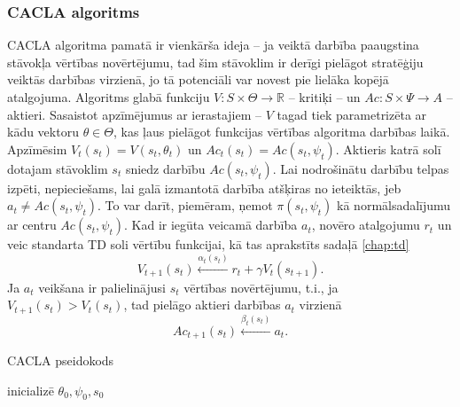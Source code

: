 \documentclass{ludis} %
\begin{document}
\subsubsection{CACLA algoritms}
CACLA algoritma pamatā ir vienkārša ideja -- ja veiktā darbība paaugstina stāvokļa vērtības novērtējumu, tad šim stāvoklim ir derīgi pielāgot stratēģiju veiktās darbības virzienā, jo tā potenciāli var novest pie lielāka kopējā atalgojuma.
Algoritms glabā funkciju $V:S \times \Theta \rightarrow \mathbb{R}$ -- kritiķi -- un $Ac : S \times \Psi \rightarrow A$ -- aktieri. Sasaistot apzīmējumus ar ierastajiem -- $V$ tagad tiek parametrizēta ar kādu vektoru $\theta \in \Theta$, kas ļaus pielāgot funkcijas vērtības algoritma darbības laikā. Apzīmēsim $V_t(s_t) = V(s_t, \theta_t)$ un $Ac_t(s_t) = Ac(s_t, \psi_t)$.
Aktieris katrā solī dotajam stāvoklim $s_t$ sniedz darbību $Ac(s_t, \psi_t)$.
Lai nodrošinātu darbību telpas izpēti, nepieciešams, lai galā izmantotā darbība atšķiras no ieteiktās, jeb $a_t \neq Ac(s_t, \psi_t)$.
To var darīt, piemēram, ņemot $\pi(s_t, \psi_t)$ kā normālsadalījumu ar centru $Ac(s_t, \psi_t)$.
Kad ir iegūta veicamā darbība $a_t$, novēro atalgojumu $r_t$ un veic standarta TD soli vērtību funkcijai, kā tas aprakstīts sadaļā \ref{chap:td}
\[
	V_{t+1}(s_t) \xleftarrow{\alpha_t(s_t)} r_t + \gamma V_t(s_{t + 1}).
\]
Ja $a_t$ veikšana ir palielinājusi $s_t$ vērtības novērtējumu, t.i., ja $V_{t+1}(s_t) > V_t(s_t)$, tad pielāgo aktieri darbības $a_t$ virzienā
\[
	Ac_{t+1}(s_t) \xleftarrow{\beta_t(s_t)} a_t.
\]


\begin{spacing}{1}
\begin{algorithm}
\caption{CACLA pseidokods}\label{alg:cacla}
inicializē $\theta_0, \psi_0, s_0$ \\
\end{algorithm}
\end{spacing}
\end{document}
